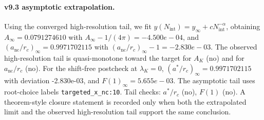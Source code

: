\paragraph{v9.3 asymptotic extrapolation.}
Using the converged high-resolution tail, we fit $y(N_{\mathrm{int}})=y_{\infty}+cN_{\mathrm{int}}^{-\alpha}$, obtaining $A_\infty=0.0791274610$ with $A_\infty-1/(4\pi)=-4.500e-04$, and $(a_{\mathrm{nc}}/r_c)_\infty=0.9971702115$ with $(a_{\mathrm{nc}}/r_c)_\infty-1=-2.830e-03$. The observed high-resolution tail is quasi-monotone toward the target for $A_K$ (no) and for $a_{\mathrm{nc}}/r_c$ (no). For the shift-free postcheck at $\lambda_K=0$, $(a^*/r_c)_\infty=0.9971702115$ with deviation -2.830e-03, and $F(1)_\infty=5.655e-03$. The asymptotic tail uses root-choice labels \texttt{targeted_x_nc:10}. Tail checks: $a^*/r_c$ (no), $F(1)$ (no). A theorem-style closure statement is recorded only when both the extrapolated limit and the
observed high-resolution tail support the same conclusion.
